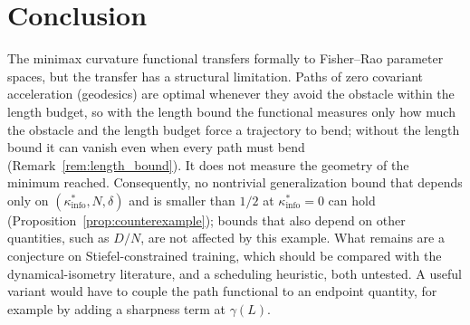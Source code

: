 \documentclass[11pt,reqno]{amsart}
\theoremstyle{definition}
\numberwithin{equation}{section}
\begin{document}
\section{Conclusion}
The minimax curvature functional transfers formally to Fisher--Rao parameter spaces, but the transfer has a structural limitation. Paths of zero covariant acceleration (geodesics) are optimal whenever they avoid the obstacle within the length budget, so with the length bound the functional measures only how much the obstacle and the length budget force a trajectory to bend; without the length bound it can vanish even when every path must bend (Remark~\ref{rem:length_bound}). It does not measure the geometry of the minimum reached. Consequently, no nontrivial generalization bound that depends only on $(\kappa^*_{\mathrm{info}}, N, \delta)$ and is smaller than $1/2$ at $\kappa^*_{\mathrm{info}} = 0$ can hold (Proposition~\ref{prop:counterexample}); bounds that also depend on other quantities, such as $D/N$, are not affected by this example. What remains are a conjecture on Stiefel-constrained training, which should be compared with the dynamical-isometry literature, and a scheduling heuristic, both untested. A useful variant would have to couple the path functional to an endpoint quantity, for example by adding a sharpness term at $\gamma(L)$.


\end{document}

